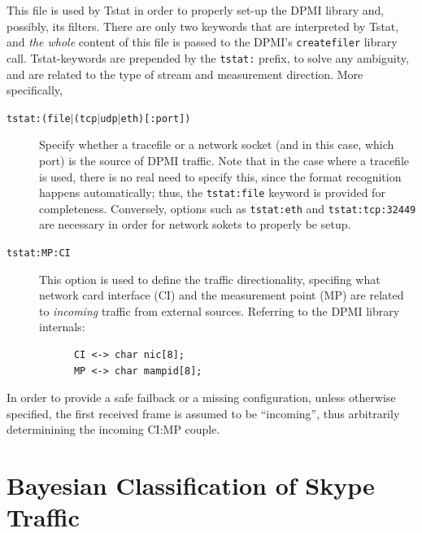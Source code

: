 \documentclass[11pt]{article}
\begin{document}
This file is used by Tstat in order to properly set-up the 
DPMI library and, possibly, its filters. There are only two
keywords that are interpreted by Tstat, and \textit{the whole} 
content of this file is passed to the DPMI's \texttt{createfiler}
library call.
Tstat-keywords are prepended by the \texttt{tstat:} prefix, to 
solve any ambiguity, and are related to the type of stream
and measurement direction.
More specifically,

\begin{description}

\item[{\texttt{tstat:(file$|$(tcp$|$udp$|$eth)[:port])}}] \mbox{}

Specify whether a tracefile or a network socket (and in this case, which port)
is the source of DPMI traffic. Note that in the case where a tracefile
is used, there is no real need to specify this, since the format recognition
happens automatically; thus, the \texttt{tstat:file} keyword is provided for completeness.
Conversely, options such as \texttt{tstat:eth} and \texttt{tstat:tcp:32449} are
necessary in order for network sokets to properly be setup.


\item[{\texttt{tstat:MP:CI}}] \mbox{}

This option is used to define the traffic directionality, specifing 
what network card interface (CI) and the measurement point (MP) 
are related to \textit{incoming} traffic from external sources.
Referring to the DPMI library internals:

\begin{small}\begin{verbatim}
      CI <-> char nic[8];     
      MP <-> char mampid[8];
\end{verbatim}\end{small} \noindent
\end{description}


In order to provide a safe failback or a missing configuration,
unless otherwise specified, the first received frame is assumed to 
be ``incoming'', thus arbitrarily determinining the incoming CI:MP 
couple.

\section{Bayesian Classification of Skype Traffic\label{Bayesian_Classification_of_Skype_Traffic}}
\end{document}
